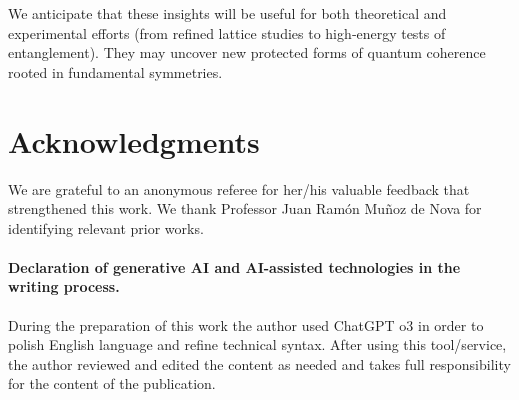 \documentclass[12pt,a4paper]{article}
\begin{document}
We anticipate that these insights will be useful for both theoretical and experimental efforts (from refined lattice studies to high‐energy tests of entanglement).
They may uncover new protected forms of quantum coherence rooted in fundamental symmetries.





\section*{Acknowledgments} 


We are grateful to an anonymous referee for her/his valuable feedback that strengthened this work.
We thank Professor Juan Ramón Muñoz de Nova for identifying relevant prior works.


\paragraph{Declaration of generative AI and AI-assisted technologies in the writing process.}
During the preparation of this work the author used ChatGPT o3 in order to polish English language and refine technical syntax.
After using this tool/service, the author reviewed and edited the content as needed and takes full responsibility for the content of the publication.
\end{document}

